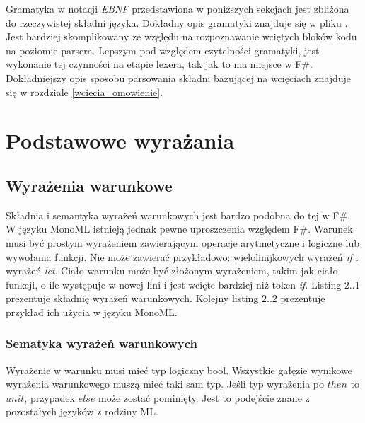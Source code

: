 \documentclass[declaration,shortabstract]{iithesis}
\begin{document}
Gramatyka w notacji \textit{EBNF} przedstawiona w poniższych sekcjach 
jest zbliżona do rzeczywistej składni języka.
Dokładny opis gramatyki znajduje się w pliku 
. Jest bardziej skomplikowany
ze względu na rozpoznawanie wciętych bloków kodu na
poziomie parsera. Lepszym pod względem czytelności gramatyki, 
jest wykonanie tej czynności na etapie lexera, tak jak to ma miejsce w F\#. Dokładniejszy opis 
sposobu parsowania składni bazującej na wcięciach znajduje się w rozdziale \ref{wciecia_omowienie}. 

\section{Podstawowe wyrażania}

\subsection{Wyrażenia warunkowe}

Składnia i semantyka wyrażeń warunkowych jest bardzo podobna do tej w F\#. W 
języku MonoML
istnieją jednak pewne uproszczenia względem F\#. 
Warunek musi być prostym wyrażeniem zawierającym operacje arytmetyczne i 
logiczne lub wywołania funkcji. Nie może zawierać przykładowo:
wielolinijkowych wyrażeń \textit{if} i wyrażeń \textit{let}. 
Ciało warunku może być złożonym wyrażeniem, takim jak 
ciało funkcji, o ile występuje w nowej lini i jest wcięte bardziej niż 
token \textit{if}. Listing $2..1$ prezentuje składnię wyrażeń warunkowych. 
Kolejny listing $2..2$ prezentuje przykład ich użycia w języku MonoML.

\subsubsection{Sematyka wyrażeń warunkowych}
Wyrażenie w warunku musi mieć typ logiczny bool. Wszystkie gałęzie wynikowe
wyrażenia warunkowego muszą mieć taki sam typ. Jeśli typ wyrażenia po $then$ 
to $unit$, przypadek $else$ może zostać pominięty. Jest to podejście znane 
z pozostałych języków z rodziny ML.
\end{document}
